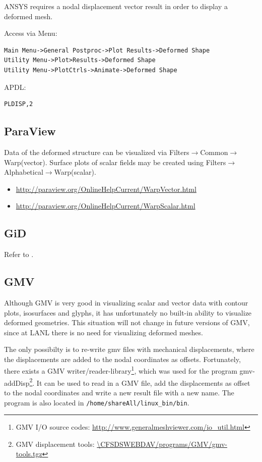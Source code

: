 ANSYS  requires a  nodal  displacement vector  result  in order  to display  a
deformed mesh.

Access via Menu:
\begin{verbatim}
Main Menu->General Postproc->Plot Results->Deformed Shape
Utility Menu->Plot>Results->Deformed Shape
Utility Menu->PlotCtrls->Animate->Deformed Shape
\end{verbatim}

APDL:
\begin{verbatim}
PLDISP,2
\end{verbatim}

\subsection{ParaView}

Data    of     the    deformed    structure    can     be    visualized    via
Filters$\rightarrow$Common$\rightarrow$Warp(vector).  Surface plots  of scalar
fields              may              be             created              using
Filters$\rightarrow$Alphabetical$\rightarrow$Warp(scalar).

\begin{itemize}
\item \url{http://paraview.org/OnlineHelpCurrent/WarpVector.html}
\item \url{http://paraview.org/OnlineHelpCurrent/WarpScalar.html}
\end{itemize}

\subsection{GiD}
Refer   to   \cite{Simkovics2010}.

\subsection{GMV}

Although GMV is  very good in visualizing scalar and  vector data with contour
plots, isosurfaces  and glyphs,  it has unfortunately  no built-in  ability to
visualize  deformed geometries.   This  situation will  not  change in  future
versions  of GMV,  since at  LANL there  is no  need for  visualizing deformed
meshes.

The only  possibilty is to  re-write gmv files with  mechanical displacements,
where  the  displacements are  added  to  the  nodal coordinates  as  offsets.
Fortunately, there exists a  GMV writer/reader-library\footnote{GMV I/O source
  codes: \url{http://www.generalmeshviewer.com/io_util.html}},  which was used
for     the    program     gmv-addDisp\footnote{GMV    displacement     tools:
  \url{\CFSDSWEBDAV/programs/GMV/gmv-tools.tgz}}.  It  can be used  to read
in a GMV  file, add the displacements  as offset to the  nodal coordinates and
write a  new result  file with  a new name.   The program  is also  located in
\texttt{/home/shareAll/linux\_bin/bin}.

